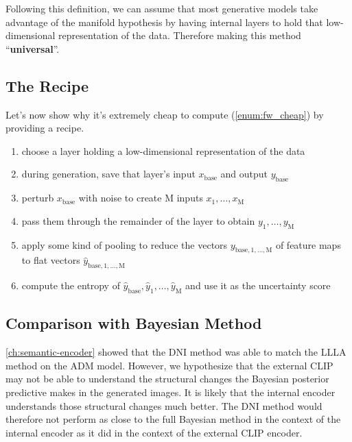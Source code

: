 Following this definition, we can assume that most generative models take advantage of the manifold hypothesis by having internal layers to hold that low-dimensional representation of the data. Therefore making this method ``\textbf{universal}''.


\subsection{The Recipe}
Let's now show why it's extremely cheap to compute (\autoref{enum:fw_cheap}) by providing a recipe.

\begin{enumerate}
    \item choose a layer holding a low-dimensional representation of the data
    \item during generation, save that layer's input $x_{\text{base}}$ and output $y_{\text{base}}$
    \item perturb $x_{\text{base}}$ with noise to create $\mathrm{M}$ inputs $x_1, \ldots, x_\mathrm{M}$
    \item pass them through the remainder of the layer to obtain $y_1, \ldots, y_\mathrm{M}$
    \item apply some kind of pooling to reduce the vectors $y_{\text{base},1,\dots,\mathrm{M}}$ of feature maps to flat vectors $\hat{y}_{\text{base},1,\dots,\mathrm{M}}$
    \item compute the entropy of $\hat{y}_{\text{base}}, \hat{y}_1, \ldots, \hat{y}_\mathrm{M}$ and use it as the uncertainty score
\end{enumerate}

\subsection{Comparison with Bayesian Method}

\autoref{ch:semantic-encoder} showed that the \acs{DNI} method was able to match the \acs{LLLA} method on the \acs{ADM} model. However, we hypothesize that the external \acs{CLIP} may not be able to understand the structural changes the Bayesian posterior predictive makes in the generated images. It is likely that the internal encoder understands those structural changes much better. The \acs{DNI} method would therefore not perform as close to the full Bayesian method in the context of the internal encoder as it did in the context of the external \acs{CLIP} encoder.

